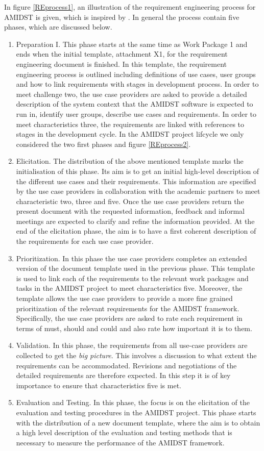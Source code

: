 \documentclass[11pt, oneside]{article}   	%
\begin{document}
In figure \ref{REprocess1}, an illustration of the requirement engineering process for AMIDST is given, which is inspired by \cite{Ebe10}.  In general the process contain five phases, which are discussed below.
\begin{enumerate}
\item Preparation I.  This phase starts at the same time as Work Package 1 and ends when the initial template, attachment X1, for the requirement engineering document is finished.  In this template, the requirement engineering process is outlined including definitions of use cases, user groups and how to link requirements with stages in development process.  In order to meet challenge two, the use case providers are asked to provide a detailed description of the system context that the AMIDST software is expected to run in, identify user groups, describe use cases and requirements.  In order to meet characteristics three, the requirements are linked with references to stages in the development cycle.  In the AMIDST project lifcycle we only considered the two first phases and figure \ref{REprocess2}.
\item Elicitation. The distribution of the above mentioned template marks the initialisation of this phase.  Its aim is to get an initial high-level description of the different use cases and their requirements. This information are specified by the use case providers in collaboration with the academic partners to meet characteristic two, three and five.  Once the use case providers return the present document with the requested information, feedback and informal meetings are expected to clarify and refine the information provided.  At the end of the elicitation phase, the aim is to have a first coherent description of the requirements for each use case provider.
 \item Prioritization. In this phase the use case providers completes an extended version of the document template used in the previous phase. This template is used to link each of the requirements to the relevant work packages and tasks in the AMIDST project to meet characteristics five. Moreover, the template allows the use case providers to provide a more fine grained prioritization of the relevant requirements for the AMIDST framework.  Specifically, the use case providers are asked to rate each requirement in terms of must, should and could and also rate how important it is to them.  
\item Validation. In this phase, the requirements from all use-case providers are collected to get the \emph{big picture}.  This involves a discussion to what extent the requirements can be accommodated. Revisions and negotiations of the detailed requirements are therefore expected.  In this step it is of key importance to ensure that characteristics five is met.
 \item Evaluation and Testing. In this phase, the focus is on the elicitation of the evaluation and testing procedures in the AMIDST project. This phase starts with the distribution of a new document template, where the aim is to obtain a high level description of the evaluation and testing methods that is necessary to measure the performance of the AMIDST framework.
\end{enumerate}
\end{document}
